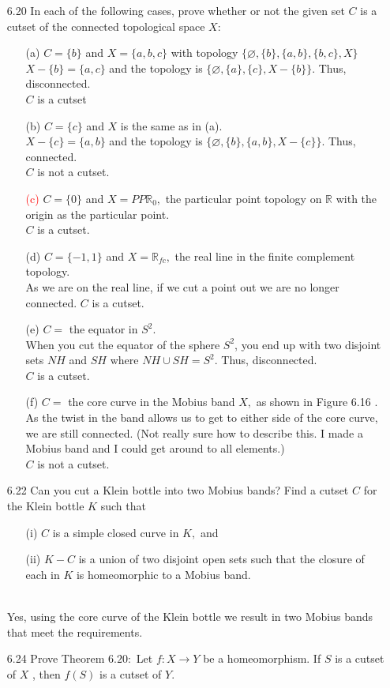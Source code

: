 \documentclass[12pt]{article}
\begin{document}
\begin{enumerate}
		\item[6.20] In each of the following cases, prove whether or not the given set $C$ is a cutset of the connected topological space $X :$
		\begin{enumerate}
			\item[(a)] $C = \{ b \}$ and $X = \{ a , b , c \}$ with topology $\{ \varnothing , \{ b \} , \{ a , b \} , \{ b , c \} , X \}$\\
			$ X - \{b\} = \{a,c\}$ and the topology is $\{\varnothing,\{a\},\{c\},X-\{b\}\} $. Thus, disconnected.\\
			$ C $ is a cutset
			\item[(b)] $C = \{ c \}$ and $X$ is the same as in (a).\\
			$ X-\{c\}=\{a,b\} $ and the topology is $ \{\varnothing, \{b\},\{a,b\},X-\{c\}\} $. Thus, connected.\\
			$ C $ is not a cutset.
			\item[\textcolor{red}{(c)}] $C = \{ 0 \}$ and $X = P P \mathbb { R } _ { 0 } ,$ the particular point topology on $\mathbb { R }$ with the origin as the particular point.\\
			$ C $ is a cutset.
			\item[(d)]	$C = \{ - 1,1 \}$ and $X = \mathbb { R } _ { f c } ,$ the real line in the finite complement topology.\\
			As we are on the real line, if we cut a point out we are no longer connected.
			$ C $ is a cutset.
			\item[(e)] $C = $ the equator in $ S^2 $. \\
			When you cut the equator of the sphere $ S^2 $, you end up with two disjoint sets $ NH $ and $ SH $ where $ NH\cup SH = S^2$. Thus, disconnected.\\
			$ C $ is a cutset.
			\item[(f)] $C =$ the core curve in the Mobius band $X ,$ as shown in Figure 6.16 .\\
			As the twist in the band allows us to get to either side of the core curve, we are still connected. (Not really sure how to describe this. I made a Mobius band and I could get around to all elements.)\\
			$ C $ is not a cutset.
		\end{enumerate}
		
		\item[6.22] Can you cut a Klein bottle into two Mobius bands? Find a cutset $C$ for the
		Klein bottle $K$ such that
		 \begin{enumerate}
		 	\item[(i)]  $C$ is a simple closed curve in $K ,$ and
		 	\item[(ii)] $K - C$ is a union of two disjoint open sets such that the closure of
		 	each in $K$ is homeomorphic to a Mobius band.
		 \end{enumerate}\\
	 	Yes, using the core curve of the Klein bottle we result in two Mobius bands that meet the requirements.
		\item[6.24] Prove Theorem $6.20 :$ Let $f : X \rightarrow Y$ be a homeomorphism. If $S$ is a cutset of $X$ , then $f ( S )$ is a cutset of $Y .$
		

\end{enumerate}
\end{document}

